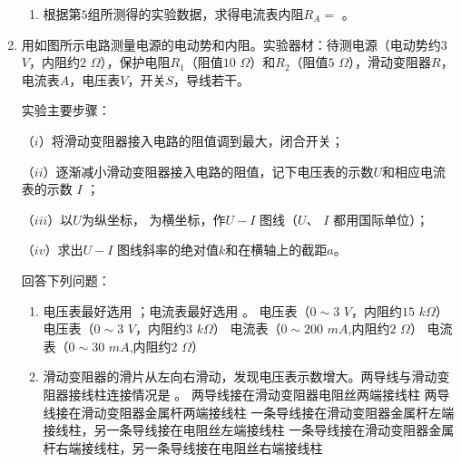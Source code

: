 \begin{enumerate}[leftmargin=0em]
\begin{enumerate}
\item 
根据第$ 5 $组所测得的实验数据，求得电流表内阻$ R_{A} = $  
。



\end{enumerate}

\newpage


\item 
{}
用如图所示电路测量电源的电动势和内阻。实验器材：待测电源（电动势约$ 3 $ $ V $，内阻约$ 2 $ $ \Omega $），保护电阻$ R_{1} $（阻值$ 10 $ $ \Omega $）和$ R_{2} $（阻值$ 5 $ $ \Omega $），滑动变阻器$ R $，电流表$ A $，电压表$ V $，开关$ S $，导线若干。
\begin{figure}[h!]
\centering

\end{figure}

实验主要步骤：

（$ i $）将滑动变阻器接入电路的阻值调到最大，闭合开关；

（$ ii $）逐渐减小滑动变阻器接入电路的阻值，记下电压表的示数$ U $和相应电流表的示数 $ I $ ；

（$ iii $）以$ U $为纵坐标，  为横坐标，作$ U-I $ 图线（$ U $、 $ I $ 都用国际单位）；

（$ iv $）求出$ U-I $ 图线斜率的绝对值$ k $和在横轴上的截距$ a $。

回答下列问题：

\begin{enumerate}
\renewcommand{\labelenumi}{\arabic{enumi}.}
\item
电压表最好选用  
；电流表最好选用  
。
\fourchoices
{电压表（$ 0 \sim 3 $ $ V $，内阻约$ 15 $ $ k \Omega $）}
{电压表（$ 0 \sim 3 $ $ V $，内阻约$ 3 $ $ k \Omega $）}
{电流表（$ 0 \sim 200 $ $ m{A} $,内阻约$ 2 $ $ \Omega $）}
{电流表（$ 0 \sim 30 $ $ m{A} $,内阻约$ 2 $ $ \Omega $）}

\item 
滑动变阻器的滑片从左向右滑动，发现电压表示数增大。两导线与滑动变阻器接线柱连接情况是  
。
\fourchoices
{两导线接在滑动变阻器电阻丝两端接线柱}
{两导线接在滑动变阻器金属杆两端接线柱}
{一条导线接在滑动变阻器金属杆左端接线柱，另一条导线接在电阻丝左端接线柱}
{一条导线接在滑动变阻器金属杆右端接线柱，另一条导线接在电阻丝右端接线柱}


\end{enumerate}
\end{enumerate}
